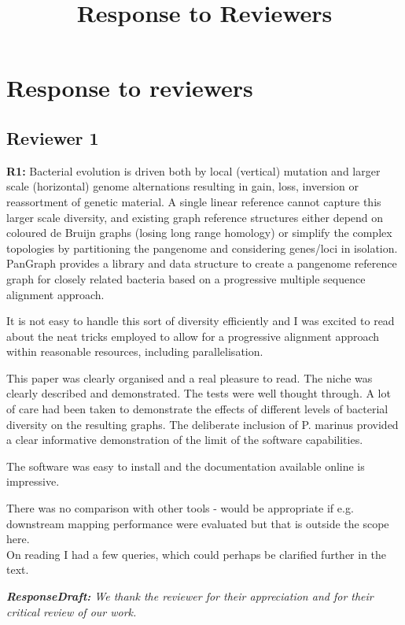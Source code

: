 \documentclass[aps,rmp,onecolumn]{revtex4-1}
\title{Response to Reviewers}
\newcommand{\reviewer}[2]{\textbf{#1:} #2\vskip 5mm}
\newcommand{\responsedraft}[1]{{\it {\color{purple}\textbf{ResponseDraft:} #1}}\vskip 5mm}
\begin{document}
\maketitle

\section*{Response to reviewers}

\subsection*{Reviewer 1}

\reviewer{R1}{Bacterial evolution is driven both by local (vertical) mutation and larger scale (horizontal) genome alternations resulting in gain, loss, inversion or reassortment of genetic material. A single linear reference cannot capture this larger scale diversity, and existing graph reference structures either depend on coloured de Bruijn graphs (losing long range homology) or simplify the complex topologies by partitioning the pangenome and considering genes/loci in isolation. PanGraph provides a library and data structure to create a pangenome reference graph for closely related bacteria based on a progressive multiple sequence alignment approach.

      It is not easy to handle this sort of diversity efficiently and I was excited to read about the neat tricks employed to allow for a progressive alignment approach within reasonable resources, including parallelisation.

      This paper was clearly organised and a real pleasure to read. The niche was clearly described and demonstrated. The tests were well thought through. A lot of care had been taken to demonstrate the effects of different levels of bacterial diversity on the resulting graphs. The deliberate inclusion of P. marinus provided a clear informative demonstration of the limit of the software capabilities.

      The software was easy to install and the documentation available online is impressive.

      There was no comparison with other tools - would be appropriate if e.g. downstream mapping performance were evaluated but that is outside the scope here.\\

      On reading I had a few queries, which could perhaps be clarified further in the text.}

\responsedraft{We thank the reviewer for their appreciation and for their critical review of our work.}
\end{document}
